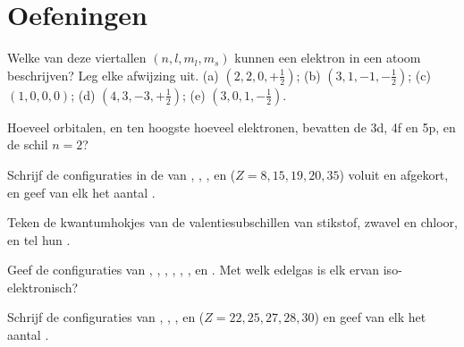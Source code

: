 \section{Oefeningen}

\begin{exercise}[$\star$]\label{exo:b1:quantum-numbers:1}
Welke van deze viertallen $(n, l, m_l, m_s)$ kunnen een elektron in een
atoom beschrijven? Leg elke afwijzing uit.
(a) $(2, 2, 0, +\tfrac12)$; (b) $(3, 1, -1, -\tfrac12)$;
(c) $(1, 0, 0, 0)$; (d) $(4, 3, -3, +\tfrac12)$; (e) $(3, 0, 1, -\tfrac12)$.
\end{exercise}

\begin{exercise}[$\star$]\label{exo:b1:quantum-numbers:2}
Hoeveel orbitalen, en ten hoogste hoeveel elektronen, bevatten de
 3d, 4f en 5p, en de schil $n = 2$?
\end{exercise}

\begin{exercise}[$\star$]\label{exo:b1:quantum-numbers:3}
Schrijf de configuraties in de  van , , ,
 en  ($Z = 8, 15, 19, 20, 35$) voluit en afgekort, en geef
van elk het aantal .
\end{exercise}

\begin{exercise}[$\star$]\label{exo:b1:quantum-numbers:4}
Teken de kwantumhokjes van de valentiesubschillen van stikstof, zwavel
en chloor, en tel hun .
\end{exercise}

\begin{exercise}[$\star\star$]\label{exo:b1:quantum-numbers:5}
Geef de configuraties van , , , ,
, ,  en . Met welk edelgas is
elk ervan iso-elektronisch?
\end{exercise}

\begin{exercise}[$\star\star$]\label{exo:b1:quantum-numbers:6}
Schrijf de configuraties van , , ,
 en  ($Z = 22, 25, 27, 28, 30$) en geef van elk
het aantal .
\end{exercise}

